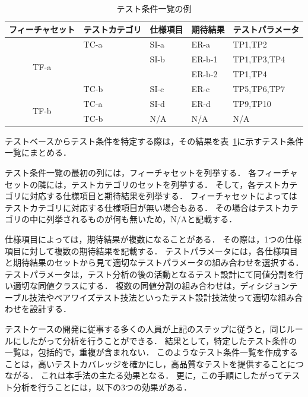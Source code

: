 \begin{table}[htbp]
  \centering
  \caption{テスト条件一覧の例}
    \begin{tabular}{|c|p{6.8em}|p{4em}|p{4em}|p{7.6em}|}
    \hline
    \multicolumn{1}{|p{7.6em}|}{フィーチャセット} & テストカテゴリ & 仕様項目 & 期待結果 & テストパラメータ \bigstrut \\
    \hline
    \hline
    \multicolumn{1}{|c|}{\multirow{4}[8]{*}{TF-a}} & TC-a  & SI-a  & ER-a  & TP1,TP2 \bigstrut\\
\cline{2-5}          & \multicolumn{1}{l|}{} & SI-b  & ER-b-1 & TP1,TP3,TP4 \bigstrut\\
\cline{2-5}          & \multicolumn{1}{l|}{} & \multicolumn{1}{l|}{} & ER-b-2 & TP1,TP4 \bigstrut\\
\cline{2-5}          & TC-b  & SI-c  & ER-c  & TP5,TP6,TP7 \bigstrut\\
    \hline
    \multicolumn{1}{|c|}{\multirow{2}[4]{*}{TF-b}} & TC-a  & SI-d  & ER-d  & TP9,TP10 \bigstrut\\
\cline{2-5}          & TC-b  & N/A   & N/A   & N/A \bigstrut\\
    \hline
    \end{tabular}%
  \label{tab:D-2testconditionliset}%
\end{table}%

テストベースからテスト条件を特定する際は，その結果を表~\ref{tab:D-2testconditionliset}に示すテスト条件一覧にまとめる．

テスト条件一覧の最初の列には，フィーチャセットを列挙する．
各フィーチャセットの隣には，テストカテゴリのセットを列挙する．
そして，各テストカテゴリに対応する仕様項目と期待結果を列挙する．
フィーチャセットによってはテストカテゴリに対応する仕様項目が無い場合もある．
その場合はテストカテゴリの中に列挙されるものが何も無いため，N/Aと記載する．


仕様項目によっては，期待結果が複数になることがある．
その際は，1つの仕様項目に対して複数の期待結果を記載する．
テストパラメータには，各仕様項目と期待結果のセットから見て適切なテストパラメータの組み合わせを選択する．
テストパラメータは，テスト分析の後の活動となるテスト設計にて同値分割を行い適切な同値クラスにする．
複数の同値分割の組み合わせは，ディシジョンテーブル技法やペアワイズテスト技法といったテスト設計技法使って適切な組み合わせを設計する．

テストケースの開発に従事する多くの人員が上記のステップに従うと，同じルールにしたがって分析を行うことができる．
結果として，特定したテスト条件の一覧は，包括的で，重複が含まれない．
このようなテスト条件一覧を作成することは，高いテストカバレッジを確かにし，高品質なテストを提供することにつながる．
これは本手法の主たる効果となる．
更に，この手順にしたがってテスト分析を行うことには，以下の3つの効果がある．

